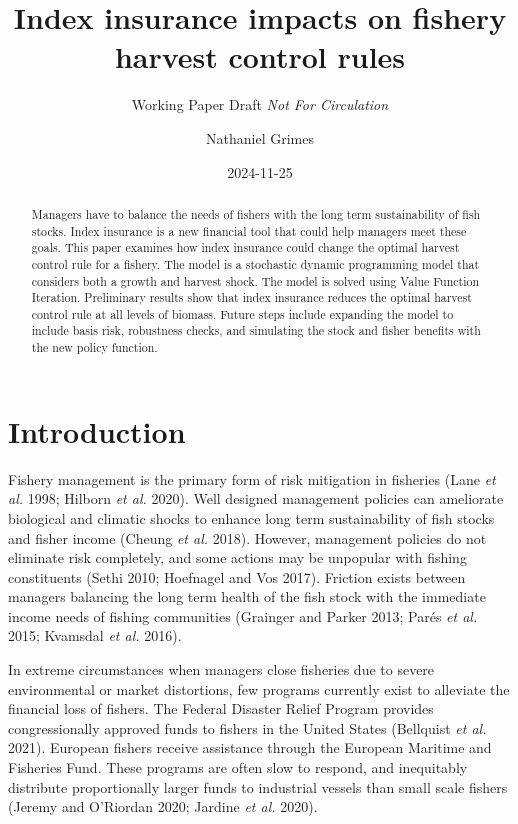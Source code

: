 \documentclass[
  letterpaper,
  DIV=11,
  numbers=noendperiod]{scrartcl}
\title{Index insurance impacts on fishery harvest control rules}
\subtitle{Working Paper Draft \emph{Not For Circulation}}
\author{Nathaniel Grimes}
\date{2024-11-25}
\renewcommand*\contentsname{Table of contents}
\newcommand\contentsname{Table of contents}
\begin{document}
\maketitle
\begin{abstract}
Managers have to balance the needs of fishers with the long term
sustainability of fish stocks. Index insurance is a new financial tool
that could help managers meet these goals. This paper examines how index
insurance could change the optimal harvest control rule for a fishery.
The model is a stochastic dynamic programming model that considers both
a growth and harvest shock. The model is solved using Value Function
Iteration. Preliminary results show that index insurance reduces the
optimal harvest control rule at all levels of biomass. Future steps
include expanding the model to include basis risk, robustness checks,
and simulating the stock and fisher benefits with the new policy
function.
\end{abstract}
\ifdefined\Shaded\renewenvironment{Shaded}{\begin{tcolorbox}[enhanced, interior hidden, borderline west={3pt}{0pt}{shadecolor}, sharp corners, frame hidden, breakable, boxrule=0pt]}{\end{tcolorbox}}\fi

\renewcommand*\contentsname{Table of contents}
{
\hypersetup{linkcolor=}
\setcounter{tocdepth}{3}
\tableofcontents
}
\hypertarget{introduction}{%
\section{Introduction}\label{introduction}}

Fishery management is the primary form of risk mitigation in fisheries
(Lane \emph{et al.} 1998; Hilborn \emph{et al.} 2020). Well designed
management policies can ameliorate biological and climatic shocks to
enhance long term sustainability of fish stocks and fisher income
(Cheung \emph{et al.} 2018). However, management policies do not
eliminate risk completely, and some actions may be unpopular with
fishing constituents (Sethi 2010; Hoefnagel and Vos 2017). Friction
exists between managers balancing the long term health of the fish stock
with the immediate income needs of fishing communities (Grainger and
Parker 2013; Parés \emph{et al.} 2015; Kvamsdal \emph{et al.} 2016).

In extreme circumstances when managers close fisheries due to severe
environmental or market distortions, few programs currently exist to
alleviate the financial loss of fishers. The Federal Disaster Relief
Program provides congressionally approved funds to fishers in the United
States (Bellquist \emph{et al.} 2021). European fishers receive
assistance through the European Maritime and Fisheries Fund. These
programs are often slow to respond, and inequitably distribute
proportionally larger funds to industrial vessels than small scale
fishers (Jeremy and O'Riordan 2020; Jardine \emph{et al.} 2020).
\end{document}
